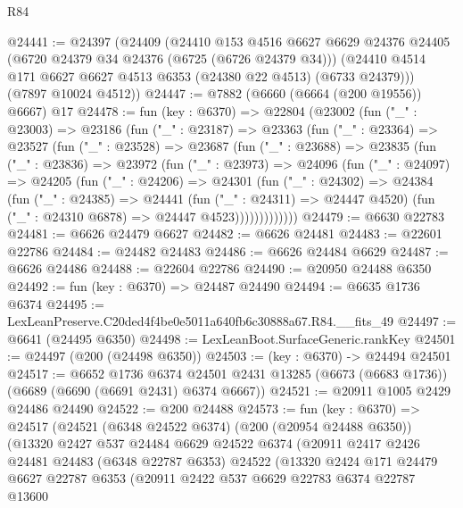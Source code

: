 \begin{lexlean}{R84}
\begin{coremodule}
@24441 := @24397
    (@24409
      (@24410
        @153
        @4516
        @6627
        @6629
        @24376
        @24405
        (@6720 @24379 @34 @24376 (@6725 (@6726 @24379 @34)))
        (@24410 @4514 @171 @6627 @6627 @4513 @6353 (@24380 @22 @4513) (@6733 @24379)))
      (@7897 @10024 @4512))
@24447 := @7882 (@6660 (@6664 (@200 @19556)) @6667) @17
@24478 := fun (key : @6370) =>
  @22804
    (@23002
      (fun ("_" : @23003) =>
      @23186
        (fun ("_" : @23187) =>
        @23363
          (fun ("_" : @23364) =>
          @23527
            (fun ("_" : @23528) =>
            @23687
              (fun ("_" : @23688) =>
              @23835
                (fun ("_" : @23836) =>
                @23972
                  (fun ("_" : @23973) =>
                  @24096
                    (fun ("_" : @24097) =>
                    @24205
                      (fun ("_" : @24206) =>
                      @24301
                        (fun ("_" : @24302) =>
                        @24384
                          (fun ("_" : @24385) =>
                          @24441
                            (fun ("_" : @24311) => @24447 @4520)
                            (fun ("_" : @24310 @6878) => @24447 @4523)))))))))))))
@24479 := @6630 @22783
@24481 := @6626 @24479 @6627
@24482 := @6626 @24481
@24483 := @22601 @22786
@24484 := @24482 @24483
@24486 := @6626 @24484 @6629
@24487 := @6626 @24486
@24488 := @22604 @22786
@24490 := @20950 @24488 @6350
@24492 := fun (key : @6370) => @24487 @24490
@24494 := @6635 @1736 @6374
@24495 := LexLeanPreserve.C20ded4f4be0e5011a640fb6c30888a67.R84.__fits_49
@24497 := @6641 (@24495 @6350)
@24498 := LexLeanBoot.SurfaceGeneric.rankKey
@24501 := @24497 (@200 (@24498 @6350))
@24503 := (key : @6370) -> @24494 @24501
@24517 := @6652
    @1736
    @6374
    @24501
    @2431
    @13285
    (@6673 (@6683 @1736))
    (@6689 (@6690 (@6691 @2431) @6374 @6667))
@24521 := @20911 @1005 @2429 @24486 @24490
@24522 := @200 @24488
@24573 := fun (key : @6370) =>
  @24517
    (@24521
      (@6348 @24522 @6374)
      (@200 (@20954 @24488 @6350))
      (@13320
        @2427
        @537
        @24484
        @6629
        @24522
        @6374
        (@20911
          @2417
          @2426
          @24481
          @24483
          (@6348 @22787 @6353)
          @24522
          (@13320
            @2424
            @171
            @24479
            @6627
            @22787
            @6353
            (@20911
              @2422
              @537
              @6629
              @22783
              @6374
              @22787
              @13600

\end{coremodule}
\end{lexlean}

